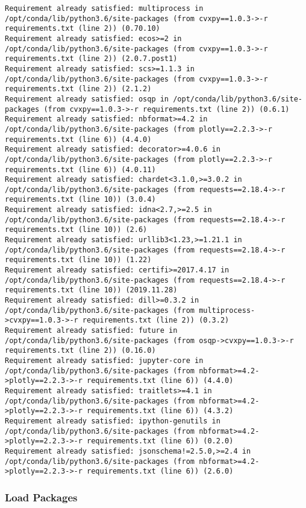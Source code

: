 \documentclass[11pt]{article}
\begin{document}
\begin{Verbatim}[commandchars=\\\{\}]
Requirement already satisfied: multiprocess in /opt/conda/lib/python3.6/site-packages (from cvxpy==1.0.3->-r requirements.txt (line 2)) (0.70.10)
Requirement already satisfied: ecos>=2 in /opt/conda/lib/python3.6/site-packages (from cvxpy==1.0.3->-r requirements.txt (line 2)) (2.0.7.post1)
Requirement already satisfied: scs>=1.1.3 in /opt/conda/lib/python3.6/site-packages (from cvxpy==1.0.3->-r requirements.txt (line 2)) (2.1.2)
Requirement already satisfied: osqp in /opt/conda/lib/python3.6/site-packages (from cvxpy==1.0.3->-r requirements.txt (line 2)) (0.6.1)
Requirement already satisfied: nbformat>=4.2 in /opt/conda/lib/python3.6/site-packages (from plotly==2.2.3->-r requirements.txt (line 6)) (4.4.0)
Requirement already satisfied: decorator>=4.0.6 in /opt/conda/lib/python3.6/site-packages (from plotly==2.2.3->-r requirements.txt (line 6)) (4.0.11)
Requirement already satisfied: chardet<3.1.0,>=3.0.2 in /opt/conda/lib/python3.6/site-packages (from requests==2.18.4->-r requirements.txt (line 10)) (3.0.4)
Requirement already satisfied: idna<2.7,>=2.5 in /opt/conda/lib/python3.6/site-packages (from requests==2.18.4->-r requirements.txt (line 10)) (2.6)
Requirement already satisfied: urllib3<1.23,>=1.21.1 in /opt/conda/lib/python3.6/site-packages (from requests==2.18.4->-r requirements.txt (line 10)) (1.22)
Requirement already satisfied: certifi>=2017.4.17 in /opt/conda/lib/python3.6/site-packages (from requests==2.18.4->-r requirements.txt (line 10)) (2019.11.28)
Requirement already satisfied: dill>=0.3.2 in /opt/conda/lib/python3.6/site-packages (from multiprocess->cvxpy==1.0.3->-r requirements.txt (line 2)) (0.3.2)
Requirement already satisfied: future in /opt/conda/lib/python3.6/site-packages (from osqp->cvxpy==1.0.3->-r requirements.txt (line 2)) (0.16.0)
Requirement already satisfied: jupyter-core in /opt/conda/lib/python3.6/site-packages (from nbformat>=4.2->plotly==2.2.3->-r requirements.txt (line 6)) (4.4.0)
Requirement already satisfied: traitlets>=4.1 in /opt/conda/lib/python3.6/site-packages (from nbformat>=4.2->plotly==2.2.3->-r requirements.txt (line 6)) (4.3.2)
Requirement already satisfied: ipython-genutils in /opt/conda/lib/python3.6/site-packages (from nbformat>=4.2->plotly==2.2.3->-r requirements.txt (line 6)) (0.2.0)
Requirement already satisfied: jsonschema!=2.5.0,>=2.4 in /opt/conda/lib/python3.6/site-packages (from nbformat>=4.2->plotly==2.2.3->-r requirements.txt (line 6)) (2.6.0)

    \end{Verbatim}

    \subsubsection{Load Packages}\label{load-packages}
\end{document}
